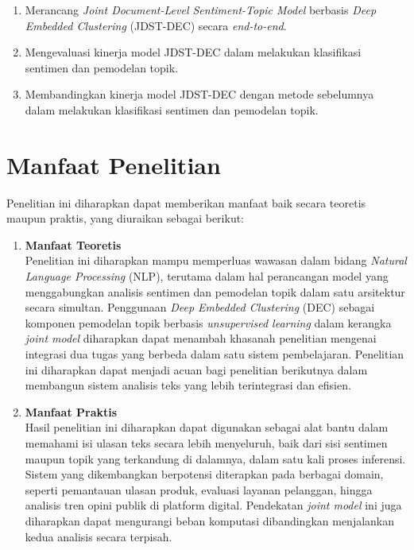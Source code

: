 \begin{enumerate}
    \item Merancang \textit{Joint Document-Level Sentiment-Topic Model} berbasis \textit{Deep Embedded Clustering} (JDST-DEC) secara \textit{end-to-end}.

    \item Mengevaluasi kinerja model JDST-DEC dalam melakukan klasifikasi sentimen dan pemodelan topik.

    \item Membandingkan kinerja model JDST-DEC dengan metode sebelumnya dalam melakukan klasifikasi sentimen dan pemodelan topik.
\end{enumerate}

\section{Manfaat Penelitian}

Penelitian ini diharapkan dapat memberikan manfaat baik secara teoretis maupun 
praktis, yang diuraikan sebagai berikut:

\begin{enumerate}
    \item \textbf{Manfaat Teoretis}\\
    Penelitian ini diharapkan mampu memperluas wawasan dalam bidang
    \textit{Natural Language Processing} (NLP), terutama dalam hal perancangan
    model yang menggabungkan analisis sentimen dan pemodelan topik dalam satu
    arsitektur secara simultan. Penggunaan \textit{Deep Embedded Clustering}
    (DEC) sebagai komponen pemodelan topik berbasis \textit{unsupervised learning}
    dalam kerangka \textit{joint model} diharapkan dapat menambah khasanah
    penelitian mengenai integrasi dua tugas yang berbeda dalam satu sistem
    pembelajaran. Penelitian ini diharapkan dapat menjadi acuan bagi penelitian
    berikutnya dalam membangun sistem analisis teks yang lebih terintegrasi
    dan efisien.

    \item \textbf{Manfaat Praktis}\\
    Hasil penelitian ini diharapkan dapat digunakan sebagai alat bantu dalam
    memahami isi ulasan teks secara lebih menyeluruh, baik dari sisi sentimen
    maupun topik yang terkandung di dalamnya, dalam satu kali proses inferensi.
    Sistem yang dikembangkan berpotensi diterapkan pada berbagai domain, seperti
    pemantauan ulasan produk, evaluasi layanan pelanggan, hingga analisis tren
    opini publik di platform digital. Pendekatan \textit{joint model} ini juga
    diharapkan dapat mengurangi beban komputasi dibandingkan menjalankan kedua
    analisis secara terpisah.
\end{enumerate}

